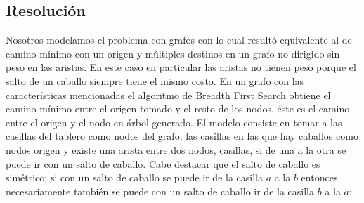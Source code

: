 \subsection{Resolución}
Nosotros modelamos el problema con grafos con lo cual resultó equivalente al de camino mínimo 
con un origen y múltiples destinos en un grafo no dirigido sin peso en las aristas. 
En este caso en particular las aristas no tienen peso porque el salto de un caballo siempre 
tiene el mismo costo. En un grafo con las características mencionadas el algoritmo de 
Breadth First Search \cite[p.~522]{cormen} obtiene el camino mínimo entre el origen tomado y el resto de los nodos,
éste es el camino entre el origen y el nodo en árbol generado.
El modelo consiste en tomar a las casillas del tablero como nodos del grafo, las casillas en las que 
hay caballos como nodos origen y existe una arista entre dos nodos, casillas, si de una a la otra se
puede ir con un salto de caballo. Cabe destacar que el salto de caballo es simétrico: si con un salto
de caballo se puede ir de la casilla $a$ a la $b$ entonces necesariamente también se puede con un 
salto de caballo ir de la casilla $b$ a la $a$:\\
